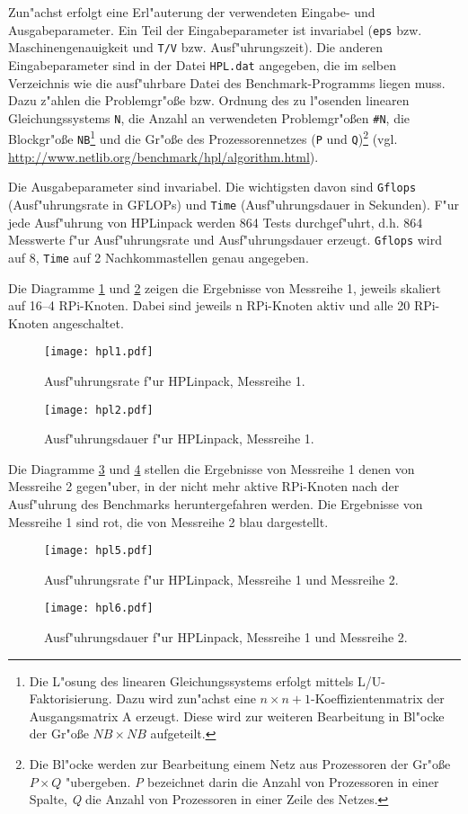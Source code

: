 Zun"achst erfolgt eine Erl"auterung der verwendeten Eingabe- und Ausgabeparameter. Ein Teil der Eingabeparameter ist invariabel (\texttt{eps} bzw. Maschinengenauigkeit und \texttt{T/V} bzw. Ausf"uhrungszeit). Die anderen Eingabeparameter sind in der Datei \texttt{HPL.dat} angegeben, die im selben Verzeichnis wie die ausf"uhrbare Datei des Benchmark-Programms liegen muss. Dazu z"ahlen die Problemgr"o\ss e bzw. Ordnung des zu l"osenden linearen Gleichungssystems \texttt{N}, die Anzahl an verwendeten Problemgr"o\ss en \texttt{\#N}, die Blockgr"o\ss e \texttt{NB}\footnote{Die L"osung des linearen Gleichungssystems erfolgt mittels L/U-Faktorisierung. Dazu wird zun"achst eine $n\times n+1$-Koeffizientenmatrix der Ausgangsmatrix A erzeugt. Diese wird zur weiteren Bearbeitung in Bl"ocke der Gr"o\ss e $NB\times NB$ aufgeteilt.} und die Gr"o\ss e des Prozessorennetzes (\texttt{P} und \texttt{Q})\footnote{Die Bl"ocke werden zur Bearbeitung einem Netz aus Prozessoren der Gr"o\ss e $P\times Q$ "ubergeben. \textit{P} bezeichnet darin die Anzahl von Prozessoren in einer Spalte, \textit{Q} die Anzahl von Prozessoren in einer Zeile des Netzes.} (vgl. \url{http://www.netlib.org/benchmark/hpl/algorithm.html}). 

Die Ausgabeparameter sind invariabel. Die wichtigsten davon sind \texttt{Gflops} (Ausf"uhrungsrate in GFLOPs) und \texttt{Time} (Ausf"uhrungsdauer in Sekunden). F"ur jede Ausf"uhrung von HPLinpack werden 864 Tests durchgef"uhrt, d.h. 864 Messwerte f"ur Ausf"uhrungsrate und Ausf"uhrungsdauer erzeugt. \texttt{Gflops} wird auf 8, \texttt{Time} auf 2 Nachkommastellen genau angegeben. 

Die Diagramme \ref{fig:hpl1} und \ref{fig:hpl2} zeigen die Ergebnisse von Messreihe 1, jeweils skaliert auf 16--4 RPi-Knoten. Dabei sind jeweils n RPi-Knoten aktiv und alle 20 RPi-Knoten angeschaltet.
\begin{figure}[htb]
  \centering
  \texttt{[image: hpl1.pdf]}\\ 
  \caption{Ausf"uhrungsrate f"ur HPLinpack, Messreihe 1.}
  \label{fig:hpl1}		
\end{figure}
\begin{figure}[htb]
  \centering
  \texttt{[image: hpl2.pdf]}\\ 
  \caption{Ausf"uhrungsdauer f"ur HPLinpack, Messreihe 1.}
  \label{fig:hpl2}		
\end{figure}
\noindent
Die Diagramme \ref{fig:hpl5} und \ref{fig:hpl6} stellen die Ergebnisse von Messreihe 1 denen von Messreihe 2 gegen"uber, in der nicht mehr aktive RPi-Knoten nach der Ausf"uhrung des Benchmarks heruntergefahren werden. Die Ergebnisse von Messreihe 1 sind rot, die von Messreihe 2 blau dargestellt.
\begin{figure}[htb]
  \centering
  \texttt{[image: hpl5.pdf]}\\ 
  \caption{Ausf"uhrungsrate f"ur HPLinpack, Messreihe 1 und Messreihe 2.}\label{fig:hpl5}
\end{figure}
\begin{figure}[htb]
  \centering
  \texttt{[image: hpl6.pdf]}\\ 
  \caption{Ausf"uhrungsdauer f"ur HPLinpack, Messreihe 1 und Messreihe 2.}\label{fig:hpl6}
\end{figure}
